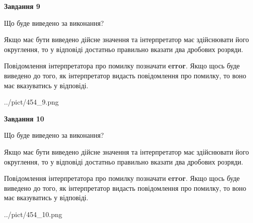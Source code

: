 \documentclass[12pt, ukrainian]{article}
\begin{document}
{\begin {Large}
{\begin {center}\textbf{Завдання 9}\end {center}}\par
Що буде виведено за виконання? \par

Якщо має бути виведено дійсне значення та інтерпретатор має здійснювати його округлення, 
то у відповіді достатньо правильно вказати два дробових розряди.

Повідомлення інтерпретатора про помилку позначати \textbf{error}.
Якщо щось буде виведено до того, як інтерпретатор видасть повідомлення про помилку, 
то воно має вказуватись у відповіді. \par

\begin{center}
	{../pict/454_9.png}
\end{center}
\newpage

{\begin {center}\textbf{Завдання 10}\end {center}}\par
Що буде виведено за виконання? \par

Якщо має бути виведено дійсне значення та інтерпретатор має здійснювати його округлення, 
то у відповіді достатньо правильно вказати два дробових розряди.

Повідомлення інтерпретатора про помилку позначати \textbf{error}.
Якщо щось буде виведено до того, як інтерпретатор видасть повідомлення про помилку, 
то воно має вказуватись у відповіді. \par

\begin{center}
	{../pict/454_10.png}
\end{center}
\newpage

\end {Large}}
\end{document}
